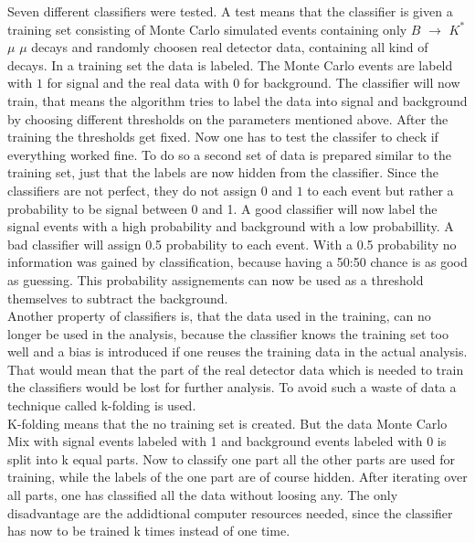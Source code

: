 \documentclass[english]{uzhpub}
\begin{document}
Seven different classifiers were tested. A test means that the classifier is given a training set consisting of Monte Carlo simulated events containing only $B$ $\rightarrow$ $K^{*}$ $\mu$ $\mu$ decays and randomly choosen real detector data, containing all kind of decays. In a training set the data is labeled. The Monte Carlo events are labeld with $1$ for signal and the real data with $0$ for background. The classifier will now train, that means the algorithm tries to label the data into signal and background by choosing different thresholds on the parameters mentioned above. After the training the thresholds get fixed. Now one has to test the classifer to check if everything worked fine. To do so a second set of data is prepared similar to the training set, just that the labels are now hidden from the classifier. Since the classifiers are not perfect, they do not assign $0$ and $1$ to each event but rather a probability to be signal between 0 and 1. A good classifier will now label the signal events with a high probability and background with a low probabillity. A bad classifier will assign 0.5 probability to each event.
With a 0.5 probability no information was gained by classification, because having a 50:50 chance is as good as guessing. This probability assignements can now be used as a threshold themselves to subtract the background. \\
Another property of classifiers is, that the data used in the training, can no longer be used in the analysis, because the classifier knows the training set too well and a bias is introduced if one reuses the training data in the actual analysis. That would mean that the part of the real detector data which is needed to train the classifiers would be lost for further analysis. To avoid such a waste of data a technique called k-folding is used. \\
K-folding means that the no training set is created. But the data Monte Carlo Mix with signal events labeled with 1 and background events labeled with 0 is split into k equal parts. Now to classify one part all the other parts are used for training, while the labels of the one part are of course hidden. After iterating over all parts, one has classified all the data without loosing any. The only disadvantage are the addidtional computer resources needed, since the classifier has now to be trained k times instead of one time.
\end{document}
